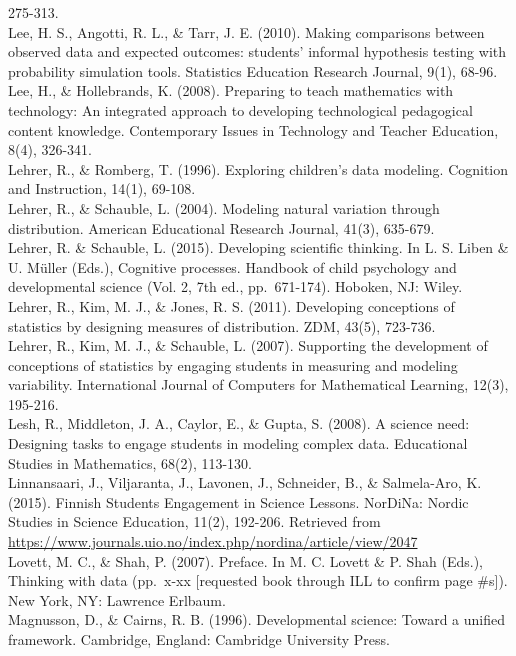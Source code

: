 \documentclass[]{msu-thesis}
\theoremstyle{definition}
\theoremstyle{definition}
\theoremstyle{definition}
\theoremstyle{remark}
\begin{document}
275-313.\\
Lee, H. S., Angotti, R. L., \& Tarr, J. E. (2010). Making comparisons
between observed data and expected outcomes: students' informal
hypothesis testing with probability simulation tools. Statistics
Education Research Journal, 9(1), 68-96.\\
Lee, H., \& Hollebrands, K. (2008). Preparing to teach mathematics with
technology: An integrated approach to developing technological
pedagogical content knowledge. Contemporary Issues in Technology and
Teacher Education, 8(4), 326-341.\\
Lehrer, R., \& Romberg, T. (1996). Exploring children's data modeling.
Cognition and Instruction, 14(1), 69-108.\\
Lehrer, R., \& Schauble, L. (2004). Modeling natural variation through
distribution. American Educational Research Journal, 41(3), 635-679.\\
Lehrer, R. \& Schauble, L. (2015). Developing scientific thinking. In L.
S. Liben \& U. Müller (Eds.), Cognitive processes. Handbook of child
psychology and developmental science (Vol. 2, 7th ed., pp.~671-174).
Hoboken, NJ: Wiley.\\
Lehrer, R., Kim, M. J., \& Jones, R. S. (2011). Developing conceptions
of statistics by designing measures of distribution. ZDM, 43(5),
723-736.\\
Lehrer, R., Kim, M. J., \& Schauble, L. (2007). Supporting the
development of conceptions of statistics by engaging students in
measuring and modeling variability. International Journal of Computers
for Mathematical Learning, 12(3), 195-216.\\
Lesh, R., Middleton, J. A., Caylor, E., \& Gupta, S. (2008). A science
need: Designing tasks to engage students in modeling complex data.
Educational Studies in Mathematics, 68(2), 113-130.\\
Linnansaari, J., Viljaranta, J., Lavonen, J., Schneider, B., \&
Salmela-Aro, K. (2015). Finnish Students Engagement in Science Lessons.
NorDiNa: Nordic Studies in Science Education, 11(2), 192-206. Retrieved
from
\url{https://www.journals.uio.no/index.php/nordina/article/view/2047}\\
Lovett, M. C., \& Shah, P. (2007). Preface. In M. C. Lovett \& P. Shah
(Eds.), Thinking with data (pp.~x-xx {[}requested book through ILL to
confirm page \#s{]}). New York, NY: Lawrence Erlbaum.\\
Magnusson, D., \& Cairns, R. B. (1996). Developmental science: Toward a
unified framework. Cambridge, England: Cambridge University Press.\\
\end{document}
